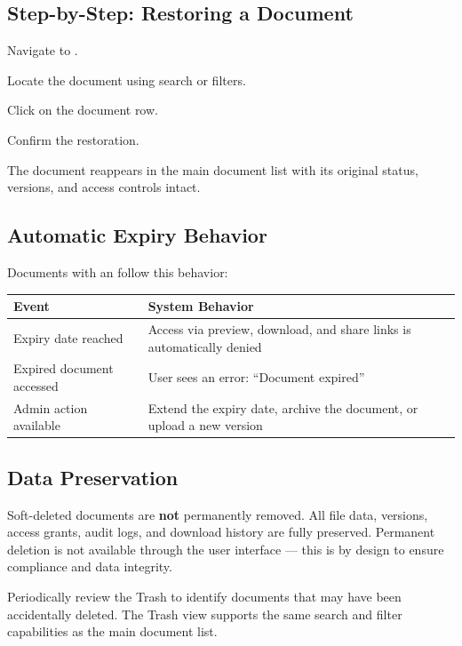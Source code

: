 \subsection{Step-by-Step: Restoring a Document}
\begin{ugSteps}
  \item Navigate to .
  \item Locate the document using search or filters.
  \item Click  on the document row.
  \item Confirm the restoration.
  \item The document reappears in the main document list with
        its original status, versions, and access controls
        intact.
\end{ugSteps}

\subsection{Automatic Expiry Behavior}

Documents with an  follow this behavior:

\begin{tabularx}{\textwidth}{@{} l X @{}}
  \toprule
  \textbf{Event} & \textbf{System Behavior} \\
  \midrule
  Expiry date reached
    & Access via preview, download, and share links is
      automatically denied \\
  Expired document accessed
    & User sees an error: ``Document expired'' \\
  Admin action available
    & Extend the expiry date, archive the document,
      or upload a new version \\
  \bottomrule
\end{tabularx}

\subsection{Data Preservation}

\begin{ugWarning}
  Soft-deleted documents are \textbf{not} permanently removed.
  All file data, versions, access grants, audit logs, and
  download history are fully preserved. Permanent deletion
  is not available through the user interface --- this is by
  design to ensure compliance and data integrity.
\end{ugWarning}

\begin{ugTip}
  Periodically review the Trash to identify documents that
  may have been accidentally deleted. The Trash view supports
  the same search and filter capabilities as the main document
  list.
\end{ugTip}

\newpage

